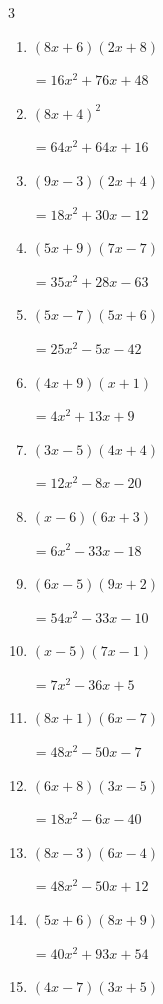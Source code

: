 \begin{multicols}{3}
\begin{enumerate}
        $=6x^{2}-41x+30$

\columnbreak %

  \item $(8x+6)(2x+8)$

        $=16x^{2}+76x+48$

  \item $(8x+4)^{2}$

        $=64x^{2}+64x+16$

  \item $(9x-3)(2x+4)$

        $=18x^{2}+30x-12$

  \item $(5x+9)(7x-7)$

        $=35x^{2}+28x-63$

  \item $(5x-7)(5x+6)$

        $=25x^{2}-5x-42$

  \item $(4x+9)(x+1)$

        $=4x^{2}+13x+9$

  \item $(3x-5)(4x+4)$

        $=12x^{2}-8x-20$

  \item $(x-6)(6x+3)$

        $=6x^{2}-33x-18$

  \item $(6x-5)(9x+2)$

        $=54x^{2}-33x-10$

  \item $(x-5)(7x-1)$

        $=7x^{2}-36x+5$

  \item $(8x+1)(6x-7)$

        $=48x^{2}-50x-7$

  \item $(6x+8)(3x-5)$

        $=18x^{2}-6x-40$

  \item $(8x-3)(6x-4)$

        $=48x^{2}-50x+12$

  \item $(5x+6)(8x+9)$

        $=40x^{2}+93x+54$

  \item $(4x-7)(3x+5)$


\end{enumerate}
\end{multicols}
